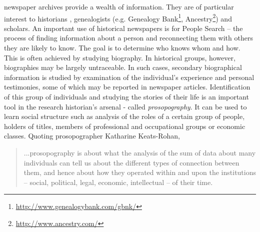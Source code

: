 \documentclass[10pt,journal,compsoc]{IEEEtran}
\begin{document}
% 
% 
% 
% 
 newspaper archives provide a wealth of information. They are of particular interest to  historians \cite{allen2010historians}, genealogists (e.g. Genealogy Bank\footnote{\url{http://www.genealogybank.com/gbnk/}}, Ancestry\footnote{\url{http://www.ancestry.com/}}) and scholars.
An important use of historical newspapers is for People Search\cite{BilenkoMCRF03,Friedman_92} -- the process of finding information about a person and reconnecting them with others they are likely to know. The goal is to determine who knows whom and how. This is often achieved by studying biography. In historical groups, however, biographies may be largely untraceable. In such cases, secondary biographical information is studied by examination of the individual's experience and personal testimonies, some of which may be reported in newspaper articles. Identification of this group of individuals and studying the stories of their life is an important tool in the research historian's arsenal - called \textit{prosopography}. 
It can be used to learn social structure such as analysis of the roles of a certain group of people, holders of titles, members of professional and occupational groups or economic classes.
Quoting prosopographer Katharine Keats-Rohan, 
\begin{quote}
...prosopography is about what the analysis of the sum of data about many individuals can tell us about the different types of connection between them, and hence about how they operated within and upon the institutions -- social, political, legal, economic, intellectual -- of their time.
\end{quote}
\end{document}
